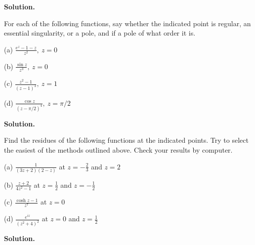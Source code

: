 \documentclass[10pt]{article}
\begin{document}
\textbf{Solution.}

\newpage

\begin{Problem}
	
	For each of the following functions, say whether the indicated point is regular, an essential singularity, or a pole, and if a pole of what order it is.
	
	\noindent (a) $\frac{e^z-1-z}{z^2},\ z = 0$
	
	\noindent (b) $\frac{\sin z}{z^3},\ z = 0$
	
	\noindent (c) $\frac{z^2-1}{(z-1)^2},\ z = 1$
	
	\noindent (d) $\frac{\cos z}{(z-\pi/2)^4},\ z = \pi/2$
	
\end{Problem}

\textbf{Solution.}

\newpage

\begin{Problem}
	
	Find the residues of the following functions at the indicated points. Try to select the easiest of the methods outlined above. Check your results by computer.
	
	\noindent (a) $\frac{1}{(3z+2)(2-z)}$ at $z=-\frac{2}{3}$ and $z=2$
	
	\noindent (b) $\frac{z+2}{4z^2-1}$ at $z=\frac{1}{2}$ and $z=-\frac{1}{2}$
	
	\noindent (c) $\frac{\cosh z-1}{z^7}$ at $z=0$
	
	\noindent (d) $\frac{e^{iz}}{(z^2+4)^2}$ at $z=0$ and $z=\frac{1}{2}$
	
\end{Problem}

\textbf{Solution.}
\end{document}
